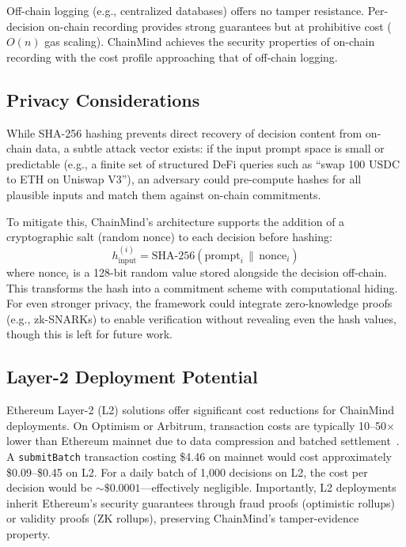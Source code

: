 \documentclass[manuscript,nonacm]{acmart}
\begin{document}
Off-chain logging (e.g., centralized databases) offers no tamper resistance.
Per-decision on-chain recording provides strong guarantees but at prohibitive cost ($O(n)$ gas scaling).
ChainMind achieves the security properties of on-chain recording with the cost profile approaching that of off-chain logging.

\subsection{Privacy Considerations}

While SHA-256 hashing prevents direct recovery of decision content from on-chain data, a subtle attack vector exists: if the input prompt space is small or predictable (e.g., a finite set of structured DeFi queries such as ``swap 100 USDC to ETH on Uniswap V3''), an adversary could pre-compute hashes for all plausible inputs and match them against on-chain commitments.

To mitigate this, ChainMind's architecture supports the addition of a cryptographic salt (random nonce) to each decision before hashing:
\begin{equation}
h_{\text{input}}^{(i)} = \text{SHA-256}(\text{prompt}_i \,\|\, \text{nonce}_i)
\end{equation}
where $\text{nonce}_i$ is a 128-bit random value stored alongside the decision off-chain.
This transforms the hash into a commitment scheme with computational hiding.
For even stronger privacy, the framework could integrate zero-knowledge proofs (e.g., zk-SNARKs) to enable verification without revealing even the hash values, though this is left for future work.

\subsection{Layer-2 Deployment Potential}

Ethereum Layer-2 (L2) solutions offer significant cost reductions for ChainMind deployments.
On Optimism or Arbitrum, transaction costs are typically 10--50$\times$ lower than Ethereum mainnet due to data compression and batched settlement~\cite{l2beat}.
A \texttt{submitBatch} transaction costing \$4.46 on mainnet would cost approximately \$0.09--\$0.45 on L2.
For a daily batch of 1,000 decisions on L2, the cost per decision would be ${\sim}\$0.0001$---effectively negligible.
Importantly, L2 deployments inherit Ethereum's security guarantees through fraud proofs (optimistic rollups) or validity proofs (ZK rollups), preserving ChainMind's tamper-evidence property.
\end{document}
